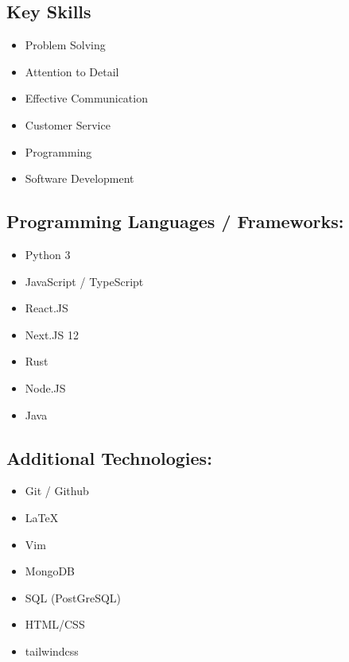 \documentclass[9pt]{extarticle}
\begin{document}
\begin{minipage}{0.3\textwidth}
	\raggedright
	\begin{tcolorbox}[colback=grey]

		\section{Key Skills}

		\begin{itemize}[leftmargin=*]
			\item Problem Solving
			\item Attention to Detail
			\item Effective Communication
			\item Customer Service
			\item Programming
			\item Software Development
		\end{itemize}

		\subsection{Programming Languages / Frameworks:}
		\begin{itemize}[leftmargin=*]

			\item Python 3
			\item JavaScript / TypeScript
			\item React.JS
			\item Next.JS 12
			\item Rust
			\item Node.JS
			\item Java

		\end{itemize}

		\subsection{Additional Technologies:}
		\begin{itemize}[leftmargin=*]
			\item Git / Github
			\item LaTeX
			\item Vim
			\item MongoDB
			\item SQL (PostGreSQL)
			\item HTML/CSS
			\item tailwindcss
		\end{itemize}

	\end{tcolorbox}

\end{minipage}
\end{document}
